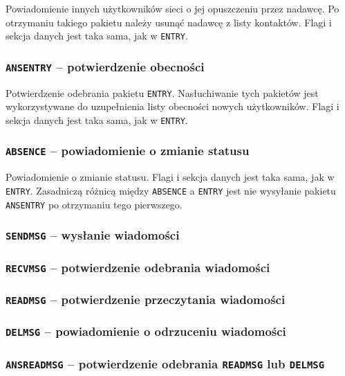 \documentclass[11pt,leqno]{article}
\begin{document}
Powiadomienie innych użytkowników sieci o jej opuszczeniu przez nadawcę. Po otrzymaniu
takiego pakietu należy usunąć nadawcę z listy kontaktów. Flagi i sekcja danych jest
taka sama, jak w \texttt{ENTRY}.

\subsubsection{\textnormal{\texttt{ANSENTRY}} -- potwierdzenie obecności}

Potwierdzenie odebrania pakietu \texttt{ENTRY}. Nasłuchiwanie tych pakietów jest
wykorzystywane do uzupełnienia listy obecności nowych użytkowników.
Flagi i sekcja danych jest taka sama, jak w \texttt{ENTRY}.

\subsubsection{\textnormal{\texttt{ABSENCE}} -- powiadomienie o zmianie statusu}

Powiadomienie o zmianie statusu. Flagi i sekcja danych jest taka sama, jak w \texttt{ENTRY}.
Zasadniczą różnicą między \texttt{ABSENCE} a \texttt{ENTRY} jest nie wysyłanie pakietu
\texttt{ANSENTRY} po otrzymaniu tego pierwszego.


\subsubsection{\textnormal{\texttt{SENDMSG}} -- wysłanie wiadomości}
\subsubsection{\textnormal{\texttt{RECVMSG}} -- potwierdzenie odebrania wiadomości}
\subsubsection{\textnormal{\texttt{READMSG}} -- potwierdzenie przeczytania wiadomości}
\subsubsection{\textnormal{\texttt{DELMSG}} -- powiadomienie o odrzuceniu wiadomości}
\subsubsection{\textnormal{\texttt{ANSREADMSG}} -- potwierdzenie odebrania \textnormal{\texttt{READMSG}} lub \textnormal{\texttt{DELMSG}}}
\end{document}
